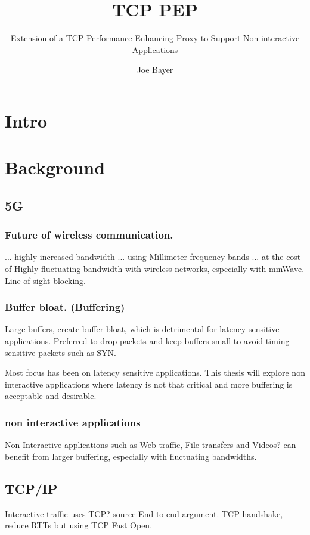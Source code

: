 \documentclass[a4paper,english, 11pt]{report}
\author{Joe Bayer}
\title{TCP PEP}
\subtitle{Extension of a TCP Performance Enhancing Proxy to
Support Non-interactive Applications}
\begin{document}
\uiomasterfp[program={Informatics: Programming and System Architecture}, supervisor={Michael Welzl}]

\tableofcontents

\chapter{Intro}

\chapter{Background}

\section{5G}
\subsection{Future of wireless communication.}
... highly increased bandwidth ... using Millimeter frequency bands ... at the cost of Highly fluctuating bandwidth with wireless networks, especially with mmWave.\\Line of sight blocking.

\subsection{Buffer bloat. (Buffering)}
Large buffers, create buffer bloat, which is detrimental for latency sensitive applications. Preferred to drop packets and keep buffers small to avoid timing sensitive packets such as SYN.

Most focus has been on latency sensitive applications. This thesis will explore non interactive applications where latency is not that critical and more buffering is acceptable and desirable.

\subsection{non interactive applications}
Non-Interactive applications such as Web traffic, File transfers and Videos? can benefit from larger buffering, especially with fluctuating bandwidths.

\section{TCP/IP}

Interactive traffic uses TCP? {source}
End to end argument.
TCP handshake, reduce RTTs but using TCP Fast Open.
\end{document}
